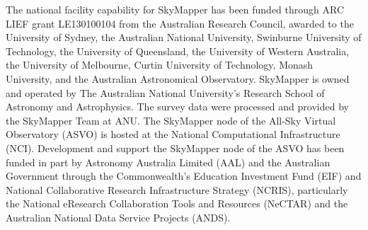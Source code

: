 \documentclass[useAMS,usenatbib]{mn2e}
\begin{document}
The national facility capability for SkyMapper has been funded through ARC LIEF grant LE130100104 from the Australian Research Council, awarded to the University of Sydney, the Australian National University, Swinburne University of Technology, the University of Queensland, the University of Western Australia, the University of Melbourne, Curtin University of Technology, Monash University, and the Australian Astronomical Observatory. SkyMapper is owned and operated by The Australian National University's Research School of Astronomy and Astrophysics. The survey data were processed and provided by the SkyMapper Team at ANU. The SkyMapper node of the All-Sky Virtual Observatory (ASVO) is hosted at the National Computational Infrastructure (NCI). Development and support the SkyMapper node of the ASVO has been funded in part by Astronomy Australia Limited (AAL) and the Australian Government through the Commonwealth's Education Investment Fund (EIF) and National Collaborative Research Infrastructure Strategy (NCRIS), particularly the National eResearch Collaboration Tools and Resources (NeCTAR) and the Australian National Data Service Projects (ANDS).





\label{lastpage}
\end{document}
